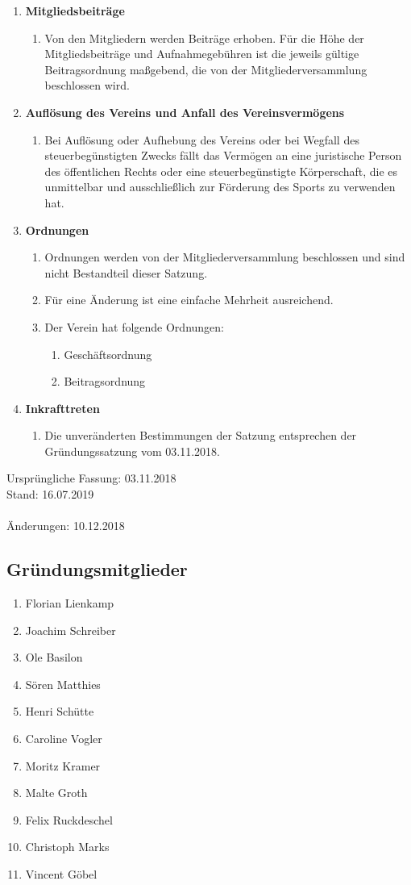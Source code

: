 \documentclass{article}
\begin{document}
\begin{enumerate}[§ 1.]
\item \textsf{\textbf{Mitgliedsbeiträge}}
\begin{enumerate}
\item[] Von den Mitgliedern werden Beiträge erhoben. Für die Höhe der Mitgliedsbeiträge und Aufnahmegebühren ist die jeweils gültige Beitragsordnung maßgebend, die von der Mitgliederversammlung beschlossen wird.
\end{enumerate}

\item \textsf{\textbf{Auflösung des Vereins und Anfall des Vereinsvermögens}}
\begin{enumerate}
\item[] Bei Auflösung oder Aufhebung des Vereins oder bei Wegfall des steuerbegünstigten Zwecks fällt das Vermögen an eine juristische Person des öffentlichen Rechts oder eine steuerbegünstigte Körperschaft, die es unmittelbar und ausschließlich zur Förderung des Sports zu verwenden hat.
\end{enumerate}

\item \textsf{\textbf{Ordnungen}}
\begin{enumerate}
\item Ordnungen werden von der Mitgliederversammlung beschlossen und sind nicht Bestandteil dieser Satzung.
\item Für eine Änderung ist eine einfache Mehrheit ausreichend.
\item Der Verein hat folgende Ordnungen:
\begin{enumerate}
\item Geschäftsordnung
\item Beitragsordnung
\end{enumerate}
\end{enumerate}

\item \textsf{\textbf{Inkrafttreten}}
\begin{enumerate}
\item[] Die unveränderten Bestimmungen der Satzung entsprechen der Gründungssatzung vom 03.11.2018.
\end{enumerate}

\end{enumerate}
Ursprüngliche Fassung: 03.11.2018\\
Stand: 16.07.2019\\
\\
Änderungen: 10.12.2018

\subsection*{Gründungsmitglieder}
\begin{enumerate}
\item Florian Lienkamp
\item Joachim Schreiber
\item Ole Basilon
\item Sören Matthies
\item Henri Schütte
\item Caroline Vogler
\item Moritz Kramer
\item Malte Groth
\item Felix Ruckdeschel
\item Christoph Marks
\item Vincent Göbel
\end{enumerate}
\end{document}
